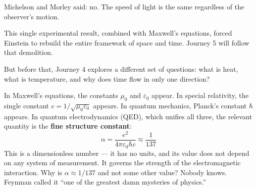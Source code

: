 \documentclass[12pt, a4paper, twoside]{book}
\theoremstyle{disc}
\begin{document}
Michelson and Morley said: no. The speed of light is the same regardless of the observer's motion.

This single experimental result, combined with Maxwell's equations, forced Einstein to rebuild the entire framework of space and time. Journey 5 will follow that demolition.

But before that, Journey 4 explores a different set of questions: what is heat, what is temperature, and why does time flow in only one direction?

\begin{deepquestion}
In Maxwell's equations, the constants $\mu_0$ and $\varepsilon_0$ appear. In special relativity, the single constant $c = 1/\sqrt{\mu_0\varepsilon_0}$ appears. In quantum mechanics, Planck's constant $\hbar$ appears. In quantum electrodynamics (QED), which unifies all three, the relevant quantity is the \textbf{fine structure constant}:
\begin{equation}
  \alpha = \frac{e^2}{4\pi\varepsilon_0\hbar c} \approx \frac{1}{137}
\end{equation}
This is a dimensionless number --- it has no units, and its value does not depend on any system of measurement. It governs the strength of the electromagnetic interaction. Why is $\alpha \approx 1/137$ and not some other value? Nobody knows. Feynman called it ``one of the greatest damn mysteries of physics.''
\end{deepquestion}
\end{document}
